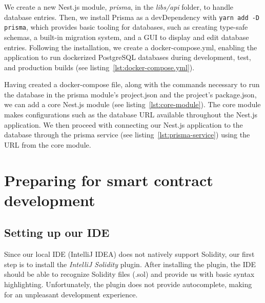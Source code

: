 We create a new Nest.js module, \emph{prisma}, in the \emph{libs/api} folder, to handle database entries.
Then, we install Prisma as a devDependency with \texttt{yarn add -D prisma}, which provides basic tooling for databases, such as creating type-safe schemas, a built-in migration system, and a \gls{GUI} to display and edit database entries.
Following the installation, we create a docker-compose.yml, enabling the application to run dockerized PostgreSQL databases during development, test, and production builds (see listing~\ref{lst:docker-compose.yml}).


Having created a docker-compose file, along with the commands necessary to run the database in the prisma module’s project.json and the project’s package.json, we can add a core Nest.js module (see listing~\ref{lst:core-module}).
The core module makes configurations such as the database \gls{URL} available throughout the Nest.js application.
We then proceed with connecting our Nest.js application to the database through the prisma service (see listing~\ref{lst:prisma-service}) using the \gls{URL} from the core module.


\section{Preparing for smart contract development}\label{sec:preparing-for-smart-contract-development}

\subsection{Setting up our IDE}\label{subsec:setting-up-our-ide}

Since our local \gls{IDE} (IntelliJ IDEA) does not natively support Solidity, our first step is to install the \emph{IntelliJ Solidity} plugin.
After installing the plugin, the \gls{IDE} should be able to recognize Solidity files (.sol) and provide us with basic syntax highlighting.
Unfortunately, the plugin does not provide autocomplete, making for an unpleasant development experience.

